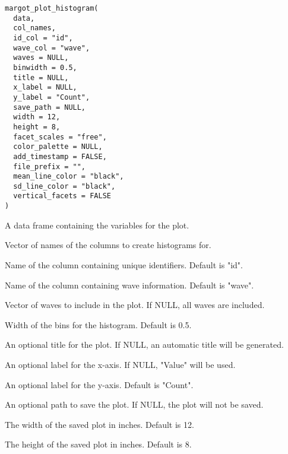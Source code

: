 \documentclass[a4paper]{book}
\begin{document}
%
\begin{Usage}
\begin{verbatim}
margot_plot_histogram(
  data,
  col_names,
  id_col = "id",
  wave_col = "wave",
  waves = NULL,
  binwidth = 0.5,
  title = NULL,
  x_label = NULL,
  y_label = "Count",
  save_path = NULL,
  width = 12,
  height = 8,
  facet_scales = "free",
  color_palette = NULL,
  add_timestamp = FALSE,
  file_prefix = "",
  mean_line_color = "black",
  sd_line_color = "black",
  vertical_facets = FALSE
)
\end{verbatim}
\end{Usage}
%
\begin{Arguments}
\begin{ldescription}
\item[\code{data}] A data frame containing the variables for the plot.

\item[\code{col\_names}] Vector of names of the columns to create histograms for.

\item[\code{id\_col}] Name of the column containing unique identifiers. Default is "id".

\item[\code{wave\_col}] Name of the column containing wave information. Default is "wave".

\item[\code{waves}] Vector of waves to include in the plot. If NULL, all waves are included.

\item[\code{binwidth}] Width of the bins for the histogram. Default is 0.5.

\item[\code{title}] An optional title for the plot. If NULL, an automatic title will be generated.

\item[\code{x\_label}] An optional label for the x-axis. If NULL, "Value" will be used.

\item[\code{y\_label}] An optional label for the y-axis. Default is "Count".

\item[\code{save\_path}] An optional path to save the plot. If NULL, the plot will not be saved.

\item[\code{width}] The width of the saved plot in inches. Default is 12.

\item[\code{height}] The height of the saved plot in inches. Default is 8.


\end{ldescription}
\end{Arguments}
\end{document}
